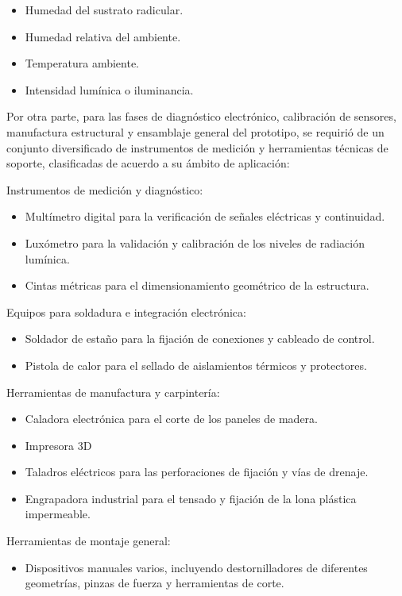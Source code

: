 \begin{itemize}
    \item Humedad del sustrato radicular.
    \item Humedad relativa del ambiente.
    \item Temperatura ambiente.
    \item Intensidad lumínica o iluminancia.
\end{itemize}

Por otra parte, para las fases de diagnóstico electrónico, calibración de sensores, manufactura estructural y ensamblaje general del prototipo, se requirió de un conjunto diversificado de instrumentos de medición y herramientas técnicas de soporte, clasificadas de acuerdo a su ámbito de aplicación:

Instrumentos de medición y diagnóstico:
\begin{itemize}
    \item Multímetro digital para la verificación de señales eléctricas y continuidad.
    \item Luxómetro para la validación y calibración de los niveles de radiación lumínica.
    \item Cintas métricas para el dimensionamiento geométrico de la estructura.
\end{itemize}

Equipos para soldadura e integración electrónica:
\begin{itemize}
    \item Soldador de estaño para la fijación de conexiones y cableado de control.
    \item Pistola de calor para el sellado de aislamientos térmicos y protectores.
\end{itemize}

Herramientas de manufactura y carpintería:
\begin{itemize}
    \item Caladora electrónica para el corte de los paneles de madera.
    \item Impresora 3D
    \item Taladros eléctricos para las perforaciones de fijación y vías de drenaje.
    \item Engrapadora industrial para el tensado y fijación de la lona plástica impermeable.
\end{itemize}

Herramientas de montaje general:
\begin{itemize}
    \item Dispositivos manuales varios, incluyendo destornilladores de diferentes geometrías, pinzas de fuerza y herramientas de corte.
\end{itemize}

